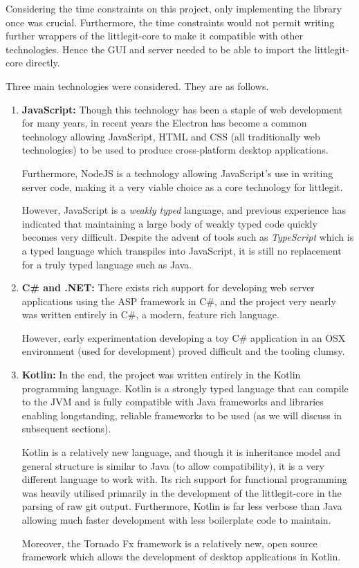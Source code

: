 Considering the time constraints on this project, only implementing the library once was crucial. Furthermore, the time constraints would not permit writing further wrappers of the littlegit-core to make it compatible with other technologies. Hence the GUI and server needed to be able to import the littlegit-core directly. 

Three main technologies were considered. They are as follows.

\begin{enumerate}
\item \textbf{JavaScript:} Though this technology has been a staple of web development for many years, in recent years the Electron \cite{electron} has become a common technology allowing JavaScript, HTML and CSS (all traditionally web technologies) to be used to produce cross-platform desktop applications.

Furthermore, NodeJS \cite{nodejs} is a technology allowing JavaScript's use in writing server code, making it a very viable choice as a core technology for littlegit. 

However, JavaScript is a \emph{weakly typed} language, and previous experience has indicated that maintaining a large body of weakly typed code quickly becomes very difficult. Despite the advent of tools such as \emph{TypeScript} which is a typed language which transpiles into JavaScript, it is still no replacement for a truly typed language such as Java.

\item \textbf{C\# and .NET:} There exists rich support for developing web server applications using the ASP framework in C\#, and the project very nearly was written entirely in C\#, a modern, feature rich language.

However, early experimentation developing a toy C\# application in an OSX environment (used for development) proved difficult and the tooling clumsy. 

\item \textbf{Kotlin:} In the end, the project was written entirely in the Kotlin programming language. Kotlin is a strongly typed language that can compile to the JVM and is fully compatible with Java frameworks and libraries enabling longstanding, reliable frameworks to be used (as we will discuss in subsequent sections). 

Kotlin is a relatively new language, and though it is inheritance model and general structure is similar to Java (to allow compatibility), it is a very different language to work with. Its rich support for functional programming was heavily utilised primarily in the development of the littlegit-core in the parsing of raw git output. Furthermore, Kotlin is far less verbose than Java allowing much faster development with less boilerplate code to maintain.

Moreover, the Tornado Fx \cite{tornadofx} framework is a relatively new, open source framework which allows the development of desktop applications in Kotlin. 


\end{enumerate}


